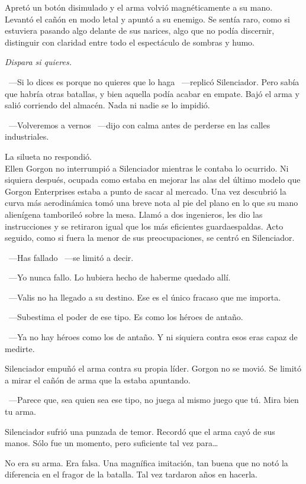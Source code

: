 Apretó un botón disimulado y el arma volvió magnéticamente a su mano. Levantó el cañón en modo letal y apuntó a su enemigo. Se sentía raro, como si estuviera pasando algo delante de sus narices, algo que no podía discernir, distinguir con claridad entre todo el espectáculo de sombras y humo.

\emph{Dispara si quieres.}

~---Si lo dices es porque no quieres que lo haga ~---replicó Silenciador. Pero sabía que habría otras batallas, y bien aquella podía acabar en empate. Bajó el arma y salió corriendo del almacén. Nada ni nadie se lo impidió.

~---Volveremos a vernos ~---dijo con calma antes de perderse en las calles industriales.

La silueta no respondió.\\

\noindent{}Ellen Gorgon no interrumpió a Silenciador mientras le contaba lo ocurrido. Ni siquiera después, ocupada como estaba en mejorar las alas del último modelo que Gorgon Enterprises estaba a punto de sacar al mercado. Una vez descubrió la curva más aerodinámica tomó una breve nota al pie del plano en lo que su mano alienígena tamborileó sobre la mesa. Llamó a dos ingenieros, les dio las instrucciones y se retiraron igual que los más eficientes guardaespaldas. Acto seguido, como si fuera la menor de sus preocupaciones, se centró en Silenciador.

~---Has fallado ~---se limitó a decir.

~---Yo nunca fallo. Lo hubiera hecho de haberme quedado allí.

~---Valis no ha llegado a su destino. Ese es el único fracaso que me importa.

~---Subestima el poder de ese tipo. Es como los héroes de antaño.

~---Ya no hay héroes como los de antaño. Y ni siquiera contra esos eras capaz de medirte.

Silenciador empuñó el arma contra su propia líder. Gorgon no se movió. Se limitó a mirar el cañón de arma que la estaba apuntando.

~---Parece que, sea quien sea ese tipo, no juega al mismo juego que tú. Mira bien tu arma.

Silenciador sufrió una punzada de temor. Recordó que el arma cayó de sus manos. Sólo fue un momento, pero suficiente tal vez para\dots{}

No era su arma. Era falsa. Una magnífica imitación, tan buena que no notó la diferencia en el fragor de la batalla. Tal vez tardaron años en hacerla.

